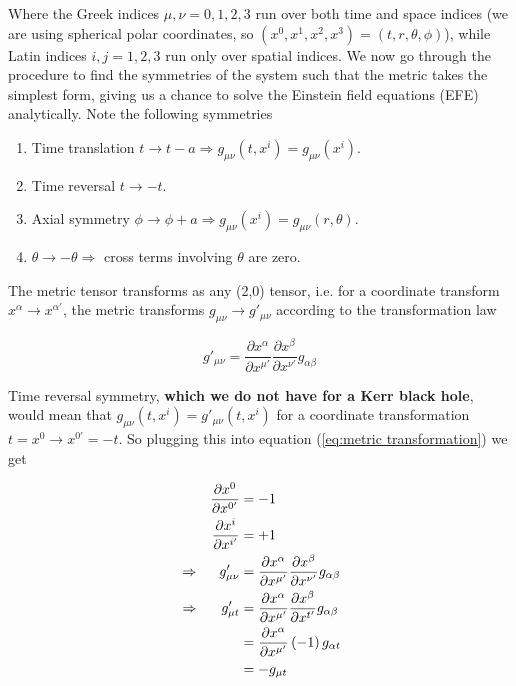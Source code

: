 \documentclass{article}
\begin{document}
Where the Greek indices $\mu, \nu = 0,1,2,3$ run over both time and space indices (we are using spherical polar coordinates, so $(x^0,x^1,x^2,x^3)=(t,r,\theta,\phi)$), while Latin indices $i, j = 1,2,3$ run only over spatial indices. We now go through the procedure to find the symmetries of the system such that the metric takes the simplest form, giving us a chance to solve the Einstein field equations (EFE) analytically. Note the following symmetries




\begin{enumerate}
    \item Time translation $t \rightarrow t-a\Rightarrow g_{\mu \nu}(t,x^i)=g_{\mu \nu}(x^i)$.
    
    \item {} Time reversal $t \rightarrow -t$.
    
    \item Axial symmetry $\phi \rightarrow \phi + a\Rightarrow g_{\mu \nu}(x^i)=g_{\mu \nu} (r, \theta)$.

    \item $\theta \rightarrow -\theta \Rightarrow$ cross terms involving $\theta$ are zero.
\end{enumerate}

The metric tensor transforms as any (2,0) tensor, i.e. for a coordinate transform $x^{\alpha} \rightarrow x^{\alpha'}$, the metric transforms $g_{\mu \nu} \rightarrow g'_{\mu \nu}$ according to the transformation law

\begin{equation}
    g'_{\mu \nu} = \frac{\partial x^{\alpha}}{\partial x^{\mu'}} \frac{\partial x^{\beta}}{\partial x^{\nu'}} g_{\alpha \beta}
\label{eq:metric transformation}
\end{equation}


Time reversal symmetry, \textbf{which we do not have for a Kerr black hole}, would mean that $g_{\mu \nu}(t, x^i) = g'_{\mu \nu}(t, x^i)$ for a coordinate transformation $t=x^0 \rightarrow x^{0'}=-t$. So plugging this into equation (\ref{eq:metric transformation}) we get 

\begin{alignat}{2}
    &&\frac{\partial x^0}{\partial x^{0'}} &= -1 \notag \\
    &&\frac{\partial x^i}{\partial x^{i'}} &= +1 \notag \\
    &\Rightarrow
    &g'_{\mu \nu} &= \frac{\partial x^{\alpha}}{\partial x^{\mu'}} \frac{\partial x^{\beta}}{\partial x^{\nu'}} g_{\alpha \beta}\notag \\
    &\Rightarrow
    &g'_{\mu t} &= \frac{\partial x^{\alpha}}{\partial x^{\mu'}} \frac{\partial x^{\beta}}{\partial x^{t'}} g_{\alpha \beta}\notag \\
    &&&=\frac{\partial x^{\alpha}}{\partial x^{\mu'}} \left( -1 \right) g_{\alpha t}\notag \\
    &&&=-g_{\mu t}
\end{alignat}
\end{document}
